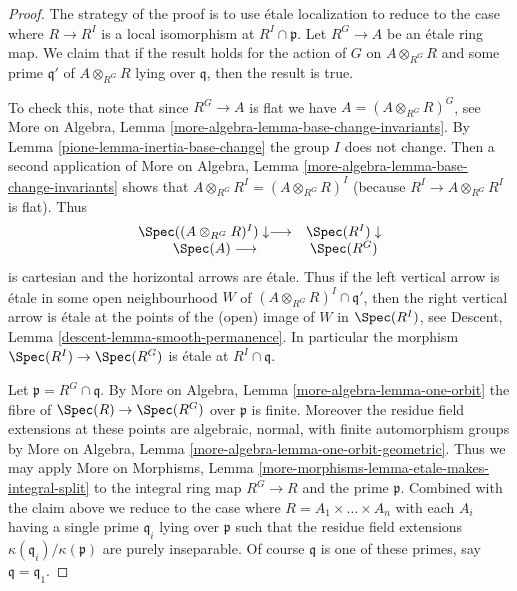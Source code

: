 \begin{proof}

The strategy of the proof is to use \'etale localization to
reduce to the case where $R \to R^I$ is a local isomorphism at
$R^I \cap \mathfrak p$.
Let $R^G \to A$ be an \'etale ring map. We claim that if the result
holds for the action of $G$ on $A \otimes_{R^G} R$ and some prime
$\mathfrak q'$ of $A \otimes_{R^G} R$ lying over $\mathfrak q$, then
the result is true.

\medskip\noindent
To check this, note that since $R^G \to A$ is flat we have
$A = (A \otimes_{R^G} R)^G$, see More on Algebra,
Lemma \ref{more-algebra-lemma-base-change-invariants}.
By Lemma \ref{pione-lemma-inertia-base-change} the group $I$ does not change.
Then a second application of More on Algebra,
Lemma \ref{more-algebra-lemma-base-change-invariants}
shows that $A \otimes_{R^G} R^I = (A \otimes_{R^G} R)^I$
(because $R^I \to A \otimes_{R^G} R^I$ is flat).
Thus
$$
\begin{array}{cc}\Spec((A \otimes_{R^G} R)^I) \downarrow\longrightarrow & \Spec(R^I) \downarrow \\ \Spec(A) \longrightarrow & \Spec(R^G)\end{array}
$$
is cartesian and the horizontal arrows are \'etale. Thus if the
left vertical arrow is \'etale in some open neighbourhood $W$ of
$(A \otimes_{R^G} R)^I \cap \mathfrak q'$, then the right vertical
arrow is \'etale at the points of the (open) image of $W$ in
$\Spec(R^I)$, see
Descent, Lemma \ref{descent-lemma-smooth-permanence}. In particular
the morphism $\Spec(R^I) \to \Spec(R^G)$ is \'etale at $R^I \cap \mathfrak q$.

\medskip\noindent
Let $\mathfrak p = R^G \cap \mathfrak q$.
By More on Algebra, Lemma \ref{more-algebra-lemma-one-orbit}
the fibre of $\Spec(R) \to \Spec(R^G)$ over $\mathfrak p$ is
finite. Moreover the residue field extensions at these points
are algebraic, normal, with finite automorphism groups by
More on Algebra, Lemma \ref{more-algebra-lemma-one-orbit-geometric}.
Thus we may apply
More on Morphisms,
Lemma \ref{more-morphisms-lemma-etale-makes-integral-split}
to the integral ring map $R^G \to R$ and the prime $\mathfrak p$.
Combined with the claim above we reduce to the case where
$R = A_1 \times \ldots \times A_n$ with each $A_i$ having a single
prime $\mathfrak q_i$ lying over $\mathfrak p$ such that the
residue field extensions $\kappa(\mathfrak q_i)/\kappa(\mathfrak p)$
are purely inseparable. Of course $\mathfrak q$ is one of
these primes, say $\mathfrak q = \mathfrak q_1$.


\end{proof}
